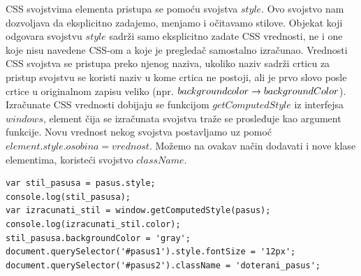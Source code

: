 \documentclass[a4paper]{article}
\begin{document}
CSS svojstvima elementa pristupa se pomoću svojstva $style$. Ovo svojstvo nam dozvoljava da eksplicitno zadajemo, menjamo i očitavamo stilove. Objekat koji odgovara
svojstvu $style$ sadrži samo eksplicitno zadate CSS vrednosti, ne i one koje nisu
navedene CSS-om a koje je pregledač samostalno izračunao. Vrednosti CSS svojstva se
pristupa preko njenog naziva, ukoliko naziv sadrži crticu za pristup svojstvu se koristi
naziv u kome crtica ne postoji, ali je prvo slovo posle crtice u originalnom zapisu veliko
(npr. $background\-color  \rightarrow backgroundColor$). Izračunate CSS vrednosti dobijaju se
funkcijom $getComputedStyle$ iz interfejsa $windows$, element čija se izračunata svojstva
traže se prosleđuje kao argument funkcije. Novu vrednost nekog svojstva postavljamo uz pomoć $element.style.osobina = vrednost$. Možemo na ovakav način dodavati i nove klase elementima, koristeći svojstvo $className$.
\begin{lstlisting}[backgroundcolor = \color{lightgray}]
var stil_pasusa = pasus.style;
console.log(stil_pasusa);
var izracunati_stil = window.getComputedStyle(pasus);
console.log(izracunati_stil.color);
stil_pasusa.backgroundColor = 'gray';
document.querySelector('#pasus1').style.fontSize = '12px';
document.querySelector('#pasus2').className = 'doterani_pasus';
\end{lstlisting} 	
\end{document}
